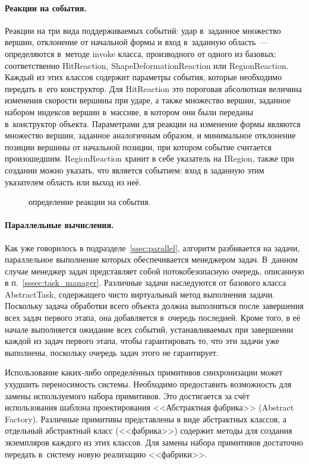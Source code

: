 \documentclass[a4paper, 14pt, titlepage]{extarticle}
\newcommand{\eng}[1]{{\English #1}}
\newcommand{\includefigure}[3][]{
    \begin{figure}[!htb]
      \center{\texttt{[image: \#2]}}
      \caption{#3} \label{fig:#2}
    \end{figure}
  }
\begin{document}
        \paragraph{Реакции на события.}
        Реакции на три вида поддерживаемых событий: удар в~заданное множество вершин, отклонение от
        начальной формы и вход в~заданную область~--- определяются в~методе invoke класса,
        производного от одного из базовых: соответственно HitReaction, ShapeDeformationReaction или RegionReaction.
        Каждый из этих классов содержит параметры события, которые
        необходимо передать в~его конструктор. Для HitReaction это пороговая абсолютная величина
        изменения скорости вершины при ударе, а также множество вершин, заданное набором индексов вершин
        в~массиве, в котором они были переданы в~конструктор объекта. Параметрами для
        реакции на изменение формы являются множество вершин, заданное аналогичным образом, и минимальное
        отклонение позиции вершины от начальной позиции, при котором событие считается произошедшим.
        RegionReaction хранит в себе указатель на IRegion, также при создании можно указать, что
        является событием: вход в заданную этим указателем область или выход из неё.

        \includefigure{core-reactions}{определение реакции на события.}

        \paragraph{Параллельные вычисления.}
        Как уже говорилось в подразделе~\ref{ssec:parallel}, алгоритм разбивается на задачи, параллельное
        выполнение которых обеспечивается менеджером задач. В~данном случае менеджер задач представляет собой
        потокобезопасную очередь, описанную в п.~\ref{sssec:task_manager}. Различные задачи
        наследуются от базового класса AbstractTask, содержащего чисто виртуальный метод выполнения
        задачи.  Поскольку задача обработки всего объекта должна выполняться после завершения всех
        задач первого этапа, она добавляется в~очередь последней. Кроме того, в её начале
        выполняется ожидание всех событий, устанавливаемых при завершении каждой из задач первого
        этапа, чтобы гарантировать то, что эти задачи уже выполнены, поскольку очередь задач этого не гарантирует.

        Использование каких-либо определённых примитивов синхронизации может ухудшить переносимость
        системы. Необходимо предоставить возможность для замены используемого набора примитивов.
        Это достигается за счёт использования шаблона проектирования <<Абстрактная фабрика>> (\eng{Abstract
        Factory}). Различные примитивы представлены в виде абстрактных классов, а отдельный
        абстрактный класс (<<фабрика>>) содержит методы для создания экземпляров каждого из этих
        классов. Для замены набора примитивов достаточно передать в~систему новую реализацию
        <<фабрики>>.
\end{document}
